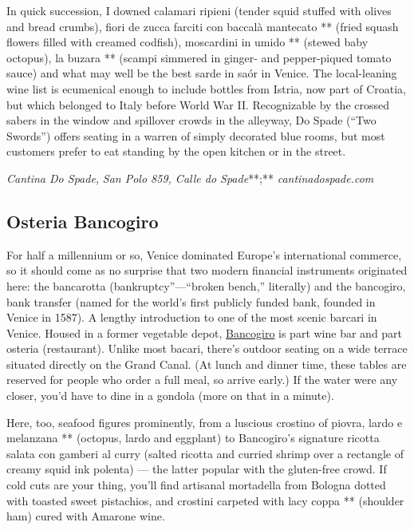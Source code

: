 In quick succession, I downed calamari ripieni (tender squid stuffed
with olives and bread crumbs), fiori de zucca farciti con baccalà
mantecato ** (fried squash flowers filled with creamed codfish),
moscardini in umido ** (stewed baby octopus), la buzara ** (scampi
simmered in ginger- and pepper-piqued tomato sauce) and what may well be
the best sarde in saór in Venice. The local-leaning wine list is
ecumenical enough to include bottles from Istria, now part of Croatia,
but which belonged to Italy before World War II. Recognizable by the
crossed sabers in the window and spillover crowds in the alleyway, Do
Spade (``Two Swords'') offers seating in a warren of simply decorated
blue rooms, but most customers prefer to eat standing by the open
kitchen or in the street.

\emph{Cantina Do Spade,} \emph{San Polo 859, Calle do Spade}**;**
\emph{cantinadospade.com}

\hypertarget{osteria-bancogiro}{%
\subsection{Osteria Bancogiro}\label{osteria-bancogiro}}

For half a millennium or so, Venice dominated Europe's international
commerce, so it should come as no surprise that two modern financial
instruments originated here: the bancarotta (bankruptcy''---``broken
bench,'' literally) and the bancogiro, bank transfer (named for the
world's first publicly funded bank, founded in Venice in 1587). A
lengthy introduction to one of the most scenic barcari in Venice. Housed
in a former vegetable depot,
\href{https://www.osteriabancogiro.it/en/}{Bancogiro} is part wine bar
and part osteria (restaurant). Unlike most bacari, there's outdoor
seating on a wide terrace situated directly on the Grand Canal. (At
lunch and dinner time, these tables are reserved for people who order a
full meal, so arrive early.) If the water were any closer, you'd have to
dine in a gondola (more on that in a minute).

Here, too, seafood figures prominently, from a luscious crostino of
piovra, lardo e melanzana ** (octopus, lardo and eggplant) to
Bancogiro's signature ricotta salata con gamberi al curry (salted
ricotta and curried shrimp over a rectangle of creamy squid ink polenta)
--- the latter popular with the gluten-free crowd. If cold cuts are your
thing, you'll find artisanal mortadella from Bologna dotted with toasted
sweet pistachios, and crostini carpeted with lacy coppa ** (shoulder
ham) cured with Amarone wine.

